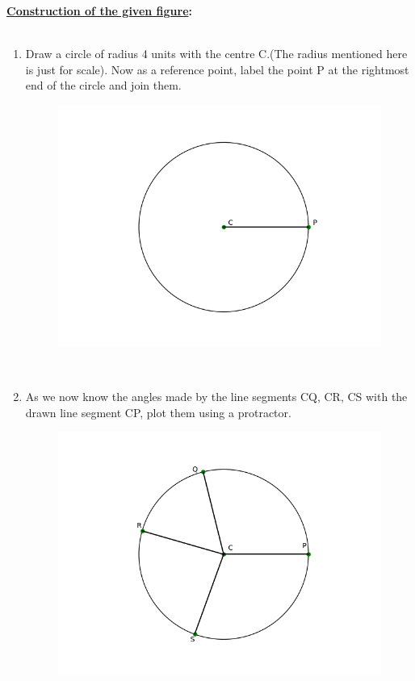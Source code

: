 \documentclass[8pt, twocolumn]{article}
\begin{document}
\textbf{\underline{Construction of the given figure}: }\\\\
\begin{enumerate}
\item Draw a circle of radius 4 units with the centre C.(The radius mentioned here is just for scale). Now as a reference point, label the point P at the rightmost end of the circle and join them.
\begin{figure}[ht]
    \centering
    \includegraphics[scale = 0.4]{figs/cnstrct_fig1.png}
\end{figure}\\
\item As we now know the angles made by the line segments CQ, CR, CS with the drawn line segment CP, plot them using a protractor.
\newpage
\begin{figure}[ht]
    \centering
    \includegraphics[scale = 0.4]{figs/cnstrct_fig2.png}

\end{figure}
\end{enumerate}
\end{document}
